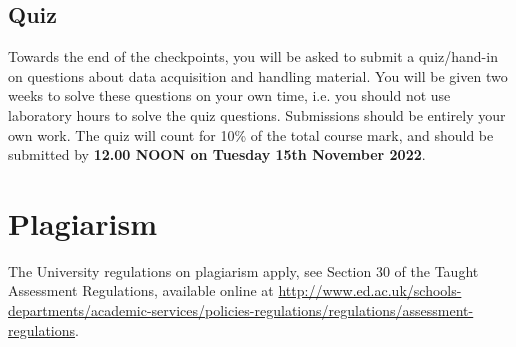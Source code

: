 \subsection{Quiz}

Towards the end of the checkpoints, you will be asked to submit a quiz/hand-in on questions about data acquisition and handling material.
You will be given two weeks to solve these questions on your own time, i.e. you should not use laboratory hours to solve the quiz questions.
Submissions should be entirely your own work.
The quiz will count for 10\% of the total course mark, and should be submitted by {\bf 12.00 NOON on Tuesday 15th November 2022}.

\section{Plagiarism}

The University regulations on plagiarism apply, see Section 30 of the Taught Assessment Regulations, available online at \url{http://www.ed.ac.uk/schools-departments/academic-services/policies-regulations/regulations/assessment-regulations}.
